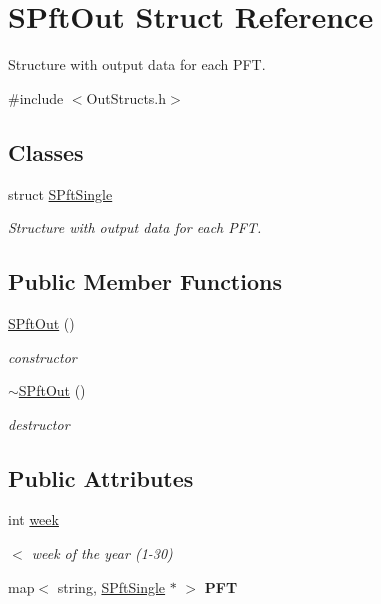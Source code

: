 \hypertarget{struct_s_pft_out}{}\section{S\+Pft\+Out Struct Reference}
\label{struct_s_pft_out}


Structure with output data for each P\+FT.  




{\ttfamily \#include $<$Out\+Structs.\+h$>$}

\subsection*{Classes}
\begin{DoxyCompactItemize}
\item 
struct \mbox{\hyperlink{struct_s_pft_out_1_1_s_pft_single}{S\+Pft\+Single}}
\begin{DoxyCompactList}\small\item\em Structure with output data for each P\+FT. \end{DoxyCompactList}\end{DoxyCompactItemize}
\subsection*{Public Member Functions}
\begin{DoxyCompactItemize}
\item 
\mbox{\hyperlink{struct_s_pft_out_afeda488058fdc8fb9fa7d6b8da750e83}{S\+Pft\+Out}} ()
\begin{DoxyCompactList}\small\item\em constructor \end{DoxyCompactList}\item 
\mbox{\hyperlink{struct_s_pft_out_a56c30a87ecbd00513eac39f2c7ad8e1d}{$\sim$\+S\+Pft\+Out}} ()
\begin{DoxyCompactList}\small\item\em destructor \end{DoxyCompactList}\end{DoxyCompactItemize}
\subsection*{Public Attributes}
\begin{DoxyCompactItemize}
\item 
int \mbox{\hyperlink{struct_s_pft_out_a9af006626f24b57e4261193f1fa17be3}{week}}
\begin{DoxyCompactList}\small\item\em $<$ week of the year (1-\/30) \end{DoxyCompactList}\item 
\mbox{\label{struct_s_pft_out_a4104000a77e8d9174c58d78ba363f076}} 
map$<$ string, \mbox{\hyperlink{struct_s_pft_out_1_1_s_pft_single}{S\+Pft\+Single}} $\ast$ $>$ {\bfseries P\+FT}
\end{DoxyCompactItemize}



